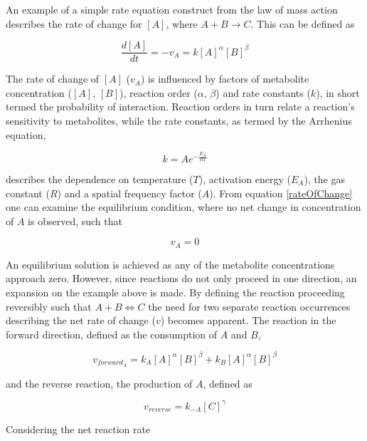 An example of a simple rate equation construct from the law of mass action describes the rate of change for $[A]$, where $A + B \longrightarrow C$. This can be defined as

\begin{equation}\label{rateOfChange}
\frac{d[A]}{dt} = -v_A = k[A]^\alpha[B]^\beta
\end{equation}

The rate of change of $[A]$ ($v_A$) is influenced by factors of metabolite concentration ($[A]$, $[B]$), reaction order ($\alpha$, $\beta$) and rate constants ($k$), in short termed the probability of interaction. Reaction orders in turn relate a reaction's sensitivity to metabolites, while the rate constants, as termed by the Arrhenius equation,

\begin{equation}\label{arenius}
k = Ae^{-\frac{E_A}{RT}}
\end{equation}

describes the dependence on temperature ($T$), activation energy ($E_A$), the gas constant ($R$) and a spatial frequency factor ($A$). From equation \ref{rateOfChange} one can examine the equilibrium condition, where no net change in concentration of $A$ is observed, such that

\begin{equation}
v_A = 0
\end{equation} 

An equilibrium solution is achieved as any of the metabolite concentrations approach zero. However, since reactions do not only proceed in one direction, an expansion on the example above is made. By defining the reaction proceeding reversibly such that $A + B \Longleftrightarrow  C$ the need for two separate reaction occurrences describing the net rate of change ($v$) becomes apparent. The reaction in the forward direction, defined as the consumption of $A$ and $B$, 

\begin{equation}\label{forwardReac}
    v_{forward}_A = k_A[A]^\alpha[B]^\beta + k_B[A]^\alpha[B]^\beta
\end{equation} 

and the reverse reaction, the production of $A$, defined as 

\begin{equation}\label{reverseReac}
v_{reverse} = k_{-A}[C]^\gamma
\end{equation}

Considering the net reaction rate 

